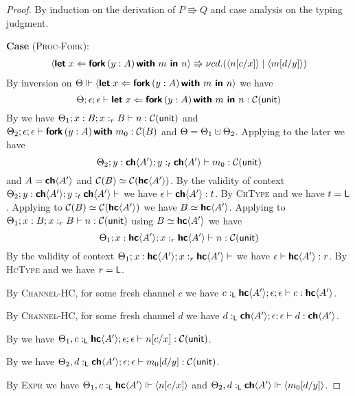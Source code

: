 \begin{proof}
  By induction on the derivation of $P \Rrightarrow Q$ and case analysis on the typing judgment.

\noindent
\textbf{Case} (\textsc{Proc-Fork}):
  \begin{align*}
    \proc{\letin{x}{\fork{y : A}{m}}{n}}
    \Rrightarrow
    \scope{cd}{(\proc{n[c/x]} \mid \proc{m[d/y]})} 
  \end{align*}
  By inversion on $\Theta \Vdash \proc{\letin{x}{\fork{y : A}{m}}{n}}$ we have
  $$\Theta ; \epsilon ; \epsilon \vdash \letin{x}{\fork{y : A}{m}}{n} : \CM{\unit}$$
  By  we have
  $\Theta_1 ; x : B ; x :_r B \vdash n : \CM{\unit}$ and
  $\Theta_2 ; \epsilon ; \epsilon \vdash \fork{y : A}{m_0} : \CM{B}$ and $\Theta = \Theta_1 \dotcup \Theta_2$.
  Applying  to the later we have
  $${\Theta_2 ; y : \CH{A'} ; y :_t \CH{A'} \vdash m_0 : \CM{\unit}}$$
  and $A = \CH{A'}$ and $\CM{B} \simeq \CM{\HC{A'}}$.
  By the validity of context ${\Theta_2 ; y : \CH{A'} ; y :_t \CH{A'} \vdash}$ we have
  $\epsilon \vdash \CH{A'} : t$. By \textsc{ChType} and  we have $t = \Ln$.
  Applying  to $\CM{B} \simeq \CM{\HC{A'}}$ we have $B \simeq \HC{A'}$.
  Applying  to 
  ${\Theta_1 ; x : B ; x :_r B \vdash n : \CM{\unit}}$ using $B \simeq \HC{A'}$ we have
  $${\Theta_1 ; x : \HC{A'} ; x :_r \HC{A'} \vdash n : \CM{\unit}}$$
  By the validity of context ${\Theta_1 ; x : \HC{A'} ; x :_r \HC{A'} \vdash}$ we have
  $\epsilon \vdash \HC{A'} : r$. By \textsc{HcType} and  we have $r = \Ln$.

  \noindent
  By \textsc{Channel-HC}, for some fresh channel $c$ we have
  $c \tL \HC{A'} ; \epsilon ; \epsilon \vdash c : \HC{A'}$.

  \noindent
  By \textsc{Channel-HC}, for some fresh channel $d$ we have
  $d \tL \CH{A'} ; \epsilon ; \epsilon \vdash d : \CH{A'}$.

  \noindent
  By  we have ${\Theta_1, c \tL \HC{A'} ; \epsilon ; \epsilon  \vdash n[c/x] : \CM{\unit}}$.

  \noindent
  By  we have ${\Theta_2, d \tL \CH{A'} ; \epsilon ; \epsilon  \vdash m_0[d/y] : \CM{\unit}}$.

  \noindent
  By \textsc{Expr} we have $\Theta_1, c \tL \HC{A'} \Vdash \proc{n[c/x]}$ and
  $\Theta_2, d \tL \CH{A'} \Vdash \proc{m_0[d/y]}$.


\end{proof}
